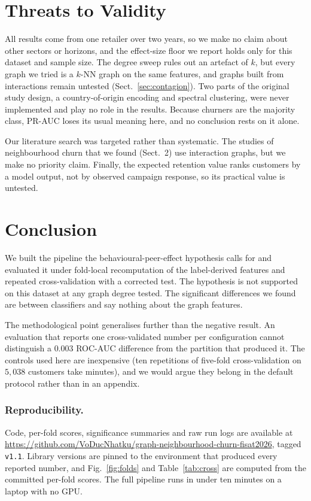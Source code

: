\documentclass[runningheads]{llncs}
\begin{document}
\section{Threats to Validity}

All results come from one retailer over two years, so we make no claim about
other sectors or horizons, and the effect-size floor we report holds only for
this dataset and sample size. The degree sweep rules out an artefact of $k$, but
every graph we tried is a $k$-NN graph on the same features, and graphs built
from interactions remain untested (Sect.~\ref{sec:contagion}). Two parts of the
original study design, a country-of-origin encoding and spectral clustering, were
never implemented and play no role in the results. Because churners are the
majority class, \mbox{PR-AUC} loses its usual meaning here, and no conclusion
rests on it alone.

Our literature search was targeted rather than systematic. The studies of
neighbourhood churn that we found (Sect.~2) use interaction graphs, but we make
no priority claim. Finally, the expected retention value ranks customers by
a model output, not by observed campaign response, so its practical value is
untested.

\section{Conclusion}

We built the pipeline the behavioural-peer-effect hypothesis calls for and
evaluated it under fold-local recomputation of the label-derived features and
repeated cross-validation with a corrected test. The hypothesis is not supported
on this dataset at any graph degree tested. The significant differences we found
are between classifiers and say nothing about the graph features.

The methodological point generalises further than the negative result. An
evaluation that reports one cross-validated number per configuration cannot
distinguish a $0.003$ ROC-AUC difference from the partition that produced it. The
controls used here are inexpensive (ten repetitions of five-fold
cross-validation on $5{,}038$ customers take minutes), and we would argue they
belong in the default protocol rather than in an appendix.

\subsubsection{Reproducibility.}
Code, per-fold scores, significance summaries and raw run logs are available at
\url{https://github.com/VoDucNhatku/graph-neighbourhood-churn-fisat2026}, tagged
\texttt{v1.1}. Library versions are pinned to the environment that
produced every reported number, and Fig.~\ref{fig:folds} and
Table~\ref{tab:cross} are computed from the committed per-fold scores. The full
pipeline runs in under ten minutes on a laptop with no GPU.
\end{document}
